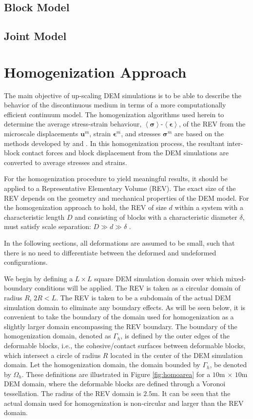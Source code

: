 \subsection{Block Model}

\subsection{Joint Model}


\section{Homogenization Approach}

The main objective of up-scaling DEM simulations is to be able to describe the  behavior of the discontinuous medium in terms of a more computationally efficient continuum model. The homogenization algorithms used herein to determine the average stress-strain behaviour, $\left<\boldsymbol{\sigma}\right>$-$\left<\boldsymbol{\epsilon}\right>$, of the REV from the microscale displacements $\mathbf{u}^m$, strain $\boldsymbol{\epsilon}^m$, and stresses $\boldsymbol{\sigma}^m$ are based on the methods developed by \citet{daddetta_particle_2004} and \citet{wellmann_homogenization_2008}. In this homogenization process, the resultant inter-block contact forces and block displacement from the DEM simulations are converted to average stresses and strains.

For the homogenization procedure to yield meaningful results, it should be applied to a Representative Elementary Volume (REV). The exact size of the REV depends on the geometry and mechanical properties of the DEM model. For the homogenization approach to hold, the REV of size $d$ within a system with a characteristic length $D$ and consisting of blocks with a characteristic diameter $\delta$, must satisfy scale separation: $D\gg d\gg\delta$ \citep{wellmann_homogenization_2008}. 

In the following sections, all deformations are assumed to be small, such that there is no need to differentiate between the deformed and undeformed configurations.  

We begin by defining a $L\times L$ square DEM simulation domain over which mixed-boundary conditions will be applied. The REV is taken as a circular domain of radius $R$, $2R<L$.  The REV is taken to be a subdomain of the actual DEM simulation domain to eliminate any boundary effects.  As will be seen below, it is convenient to take the boundary of the domain used for homogenization as a slightly larger domain encompassing the REV boundary. The boundary of the homogenization domain, denoted as $\Gamma_h$, is defined by the outer edges of the deformable blocks, i.e., the cohesive/contact surfaces between deformable blocks, which intersect a circle of radius $R$ located in the center of the DEM simulation domain. Let the homogenization domain, the domain bounded by $\Gamma_h$, be denoted by $\Omega_h$. These definitions are illustrated in Figure \ref{fig:homoarea} for a $10$m $\times$ $10$m DEM domain, where the deformable blocks are defined through a Voronoi tessellation. The radius of the REV domain is $2.5$m.  It can be seen that the actual domain used for homogenization is non-circular and larger than the REV domain. 

